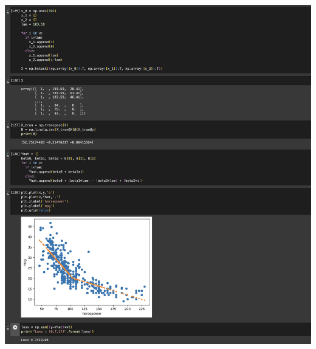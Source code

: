 \documentclass{assignment}
\begin{document}
\includegraphics[trim = {0 0 0 13.5cm}, clip,scale = 0.8]{Screenshot 2024-02-15 at 20.40.35.png}


    
\end{document}
